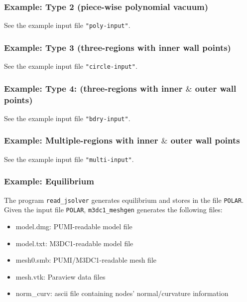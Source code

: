 \subsubsection{Example: Type 2 (piece-wise polynomial vacuum)} 

See the example input file \texttt{"poly-input"}.

\subsubsection{Example: Type 3 (three-regions with inner wall points)}
See the example input file \texttt{"circle-input"}.

\subsubsection{Example: Type 4: (three-regions with inner $\&$ outer wall points)}
See the example input file \texttt{"bdry-input"}.

\subsubsection{Example: Multiple-regions with inner $\&$ outer wall points}
See the example input file \texttt{"multi-input"}.

\subsubsection{Example: Equilibrium}

The program \texttt{read\_jsolver} generates equilibrium and stores in the file \texttt{POLAR}. Given the input file \texttt{POLAR}, \texttt{m3dc1\_meshgen} generates the following files:
\begin{itemize}
\item	model.dmg: PUMI-readable model file
\item	model.txt: M3DC1-readable model file
\item	mesh0.smb: PUMI/M3DC1-readable mesh file
\item	mesh.vtk: Paraview data files
\item	norm\_curv: ascii file containing nodes' normal/curvature information
\end{itemize} 

